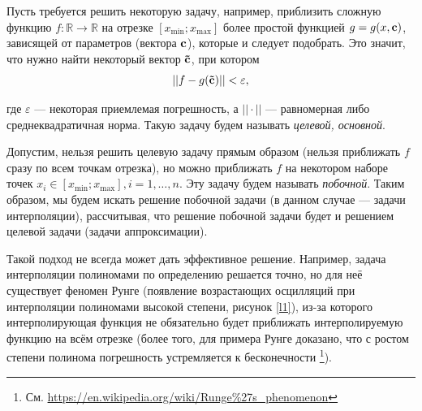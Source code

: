 \documentclass[a4paper]{article}
\begin{document}
Пусть требуется решить некоторую задачу, например, приблизить сложную функцию $f: \mathbb{R} \rightarrow \mathbb{R}$
на отрезке $[x_{\min};x_{\max}]$ более простой функцией $g=g(x,{\bf c})$, зависящей от параметров (вектора ${\bf c}$), которые и следует подобрать.
Это значит, что нужно найти некоторый вектор ${\bf \tilde{c} }$, при котором
\begin{equation*}
  ||f-g({\bf \tilde{c}})|| < \varepsilon,
\end{equation*}

где $\varepsilon$ --- некоторая приемлемая погрешность, а $||\cdot||$ --- равномерная либо среднеквадратичная норма.
Такую задачу будем называть {\it целевой, основной}.

Допустим, нельзя решить целевую задачу прямым образом (нельзя приближать $f$ сразу по всем точкам отрезка), но можно приближать $f$ на некотором наборе точек $x_i \in [x_{\min};x_{\max}], i=1,\dots,n$.
Эту задачу будем называть {\it побочной}. Таким образом,
мы будем искать решение побочной задачи (в данном случае --- задачи интерполяции),
рассчитывая, что решение побочной задачи будет и решением целевой задачи (задачи аппроксимации).

Такой подход не всегда может дать эффективное решение. Например, задача интерполяции полиномами по определению решается точно,
но для неё существует феномен Рунге (появление возрастающих осцилляций при интерполяции полиномами высокой степени, рисунок \ref{l1}),
из-за которого интерполирующая функция не обязательно будет приближать интерполируемую функцию на всём отрезке
(более того, для примера Рунге доказано, что с ростом степени полинома погрешность устремляется к бесконечности \footnote{См. \url{https://en.wikipedia.org/wiki/Runge\%27s_phenomenon} }).
\end{document}
